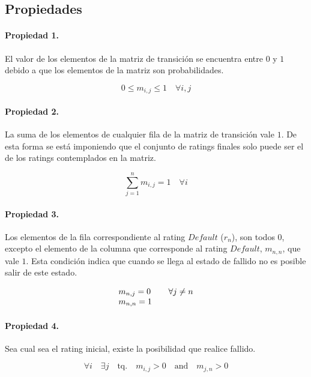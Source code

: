 \subsection{Propiedades}
\label{sec:mtransition:properties}

\paragraph{Propiedad 1.}
El valor de los elementos de la matriz de transici\'on se encuentra entre $0$ 
y $1$ debido a que los elementos de la matriz son probabilidades.

\begin{equation}
0 \leq m_{i,j} \leq 1 \quad \forall i,j
\end{equation}

\paragraph{Propiedad 2.}
La suma de los elementos de cualquier fila de la matriz de transici\'on vale $1$.
De esta forma se  est\'a imponiendo que el conjunto de ratings finales solo puede 
ser el de los ratings contemplados en la matriz.

\begin{equation}
\sum_{j=1}^{n} m_{i,j} = 1 \quad \forall i
\end{equation}

\paragraph{Propiedad 3.}
Los elementos de la fila correspondiente al rating $Default$ ($r_n$), son todos 
$0$, excepto el elemento de la columna que corresponde al rating $Default$, 
$m_{n,n}$, que vale $1$. Esta condici\'on indica que cuando se llega al estado 
de fallido no es posible salir de este estado.

\begin{equation}
\begin{array}{ll}
m_{n,j} = 0        & \quad \forall j \neq n \cr
m_{n,n} = 1
\end{array}
\end{equation}

\paragraph{Propiedad 4.}
Sea cual sea el rating inicial, existe la posibilidad que realice fallido.

\begin{equation}
\forall i \quad \exists j \quad \textrm{tq.} \quad m_{i,j} > 0 \quad \textrm{and} \quad  m_{j,n} > 0
\end{equation}

